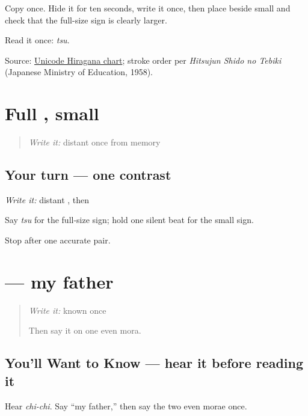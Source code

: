 Copy \textbf{} once. Hide it for ten seconds, write it once, then place \textbf{} beside small \textbf{} and check that the full-size sign is clearly larger.

\begin{tcolorbox}[breakable,colback=teal!4,colframe=teal!35!black,title={Before you move on}]
Read it once: \emph{tsu}.

Source: \href{https://www.unicode.org/charts/PDF/U3040.pdf}{Unicode Hiragana chart}; stroke order per \emph{Hitsujun Shido no Tebiki} (Japanese Ministry of Education, 1958).
\end{tcolorbox}
\section[Practice]{Full , small }

\label{lesson:JA-R13-tsu-contrast}



\begin{quote}
\emph{Write it:} distant \textbf{} once from memory
\end{quote}

\subsection*{Your turn — one contrast}
\emph{Write it:} distant \textbf{}, then \textbf{}

Say \emph{tsu} for the full-size sign; hold one silent beat for the small sign.

\begin{tcolorbox}[breakable,colback=teal!4,colframe=teal!35!black,title={Before you move on}]
Stop after one accurate pair.
\end{tcolorbox}
\section[\texorpdfstring{\ja{ちち} (chichi)}{ちち (chichi)}]{ — my father}

\label{lesson:JA-C13-chichi}



\begin{quote}
\emph{Write it:} known \textbf{} once

Then say it on one even mora.
\end{quote}

\subsection*{You'll Want to Know — hear it before reading it}
Hear \emph{chi-chi}. Say “my father,” then say the two even morae once.

